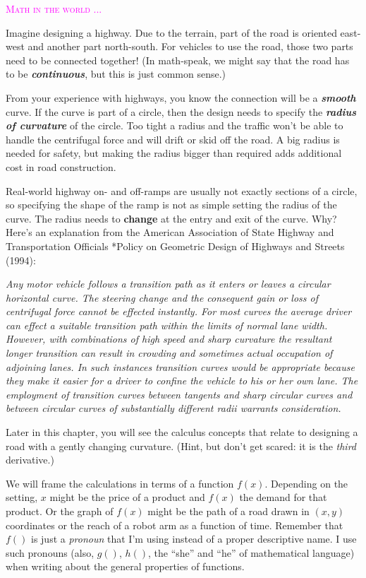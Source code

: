 \documentclass[
  letterpaper,
  DIV=11,
  numbers=noendperiod,
  oneside]{scrreprt}
\newenvironment{intheworld}%
{%
\textcolor{magenta}{\hrulefill}%
  \par\vspace{.3\baselineskip}%
  \textcolor{magenta}{\scshape Math in the world ...}%
  \par\vspace{\baselineskip}%
}%
{\textcolor{magenta}{\hrulefill}}
\begin{document}
\begin{intheworld}
Imagine designing a highway. Due to the terrain, part of the road is
oriented east-west and another part north-south. For vehicles to use the
road, those two parts need to be connected together! (In math-speak, we
might say that the road has to be \textbf{\emph{continuous}}, but this
is just common sense.)

From your experience with highways, you know the connection will be a
\textbf{\emph{smooth}} curve. If the curve is part of a circle, then the
design needs to specify the \textbf{\emph{radius of curvature}} of the
circle. Too tight a radius and the traffic won't be able to handle the
centrifugal force and will drift or skid off the road. A big radius is
needed for safety, but making the radius bigger than required adds
additional cost in road construction.

Real-world highway on- and off-ramps are usually not exactly sections of
a circle, so specifying the shape of the ramp is not as simple setting
the radius of the curve. The radius needs to \textbf{change} at the
entry and exit of the curve. Why? Here's an explanation from the
American Association of State Highway and Transportation Officials
*Policy on Geometric Design of Highways and Streets (1994):

\emph{Any motor vehicle follows a transition path as it enters or leaves
a circular horizontal curve. The steering change and the consequent gain
or loss of centrifugal force cannot be effected instantly. For most
curves the average driver can effect a suitable transition path within
the limits of normal lane width. However, with combinations of high
speed and sharp curvature the resultant longer transition can result in
crowding and sometimes actual occupation of adjoining lanes. In such
instances transition curves would be appropriate because they make it
easier for a driver to confine the vehicle to his or her own lane. The
employment of transition curves between tangents and sharp circular
curves and between circular curves of substantially different radii
warrants consideration.}

Later in this chapter, you will see the calculus concepts that relate to
designing a road with a gently changing curvature. (Hint, but don't get
scared: it is the \emph{third} derivative.)

\end{intheworld}

We will frame the calculations in terms of a function \(f(x)\).
Depending on the setting, \(x\) might be the price of a product and
\(f(x)\) the demand for that product. Or the graph of \(f(x)\) might be
the path of a road drawn in \((x,y)\) coordinates or the reach of a
robot arm as a function of time. Remember that \(f()\) is just a
\emph{pronoun} that I'm using instead of a proper descriptive name. I
use such pronouns (also, \(g()\), \(h()\), the ``she'' and ``he'' of
mathematical language) when writing about the general properties of
functions.
\end{document}
